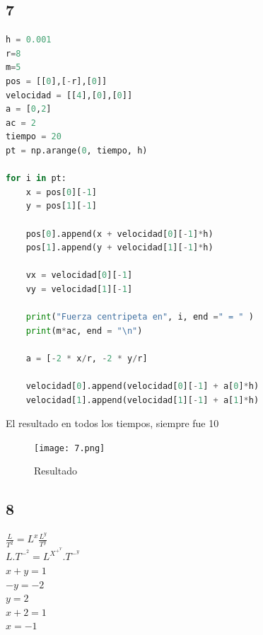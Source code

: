 \documentclass{article}
\begin{document}
\subsection{7}
\begin{lstlisting}[language=Python,caption=Desafío 1.1]
h = 0.001
r=8
m=5
pos = [[0],[-r],[0]]
velocidad = [[4],[0],[0]]
a = [0,2]
ac = 2
tiempo = 20
pt = np.arange(0, tiempo, h)

for i in pt:
    x = pos[0][-1]
    y = pos[1][-1]

    pos[0].append(x + velocidad[0][-1]*h)
    pos[1].append(y + velocidad[1][-1]*h)

    vx = velocidad[0][-1]
    vy = velocidad[1][-1]

    print("Fuerza centripeta en", i, end =" = " )
    print(m*ac, end = "\n")

    a = [-2 * x/r, -2 * y/r]

    velocidad[0].append(velocidad[0][-1] + a[0]*h)
    velocidad[1].append(velocidad[1][-1] + a[1]*h)
\end{lstlisting}
El resultado en todos los tiempos, siempre fue 10
\begin{figure}[H]
    \centering
    \texttt{[image: 7.png]}
    \caption{Resultado}
\end{figure}
\subsection{8}
\begin{center}
    $\displaystyle \frac{L}{T^2}= L^x \frac{L^y}{T^y}$ \\
    \vspace*{0.3 cm}
    $L.T^-^2 = L^X^+^Y . T^-^y$\\
    \vspace*{0.3 cm}
    $x+y=1$ \\
    \vspace*{0.3 cm}
    $-y=-2$ \\ $y=2$\\
    \vspace*{0.3 cm}
    $x+2=1$ \\ $x=-1$
\end{center}
\end{document}
